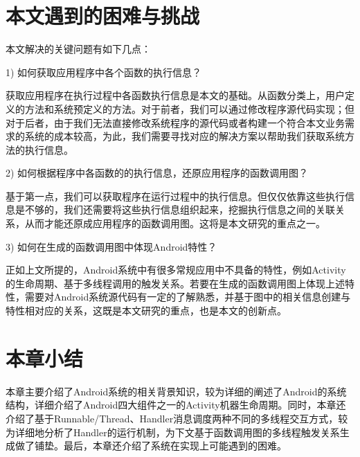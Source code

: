 \section{本文遇到的困难与挑战}


本文解决的关键问题有如下几点：

1)	如何获取应用程序中各个函数的执行信息？

获取应用程序在执行过程中各函数执行信息是本文的基础。从函数分类上，用户定义的方法和系统预定义的方法。对于前者，我们可以通过修改程序源代码实现；但对于后者，由于我们无法直接修改系统程序的源代码或者构建一个符合本文业务需求的系统的成本较高，为此，我们需要寻找对应的解决方案以帮助我们获取系统方法的执行信息。

2)	如何根据程序中各函数的的执行信息，还原应用程序的函数调用图？

基于第一点，我们可以获取程序在运行过程中的执行信息。但仅仅依靠这些执行信息是不够的，我们还需要将这些执行信息组织起来，挖掘执行信息之间的关联关系，从而才能还原成应用程序的函数调用图。这将是本文研究的重点之一。

3)	如何在生成的函数调用图中体现Android特性？

正如上文所提的，Android系统中有很多常规应用中不具备的特性，例如Activity的生命周期、基于多线程调用的触发关系。若要在生成的函数调用图上体现上述特性，需要对Android系统源代码有一定的了解熟悉，并基于图中的相关信息创建与特性相对应的关系，这既是本文研究的重点，也是本文的创新点。

\section{本章小结}

本章主要介绍了Android系统的相关背景知识，较为详细的阐述了Android的系统结构，详细介绍了Android四大组件之一的Activity机器生命周期。同时，本章还介绍了基于Runnable/Thread、Handler消息调度两种不同的多线程交互方式，较为详细地分析了Handler的运行机制，为下文基于函数调用图的多线程触发关系生成做了铺垫。最后，本章还介绍了系统在实现上可能遇到的困难。
